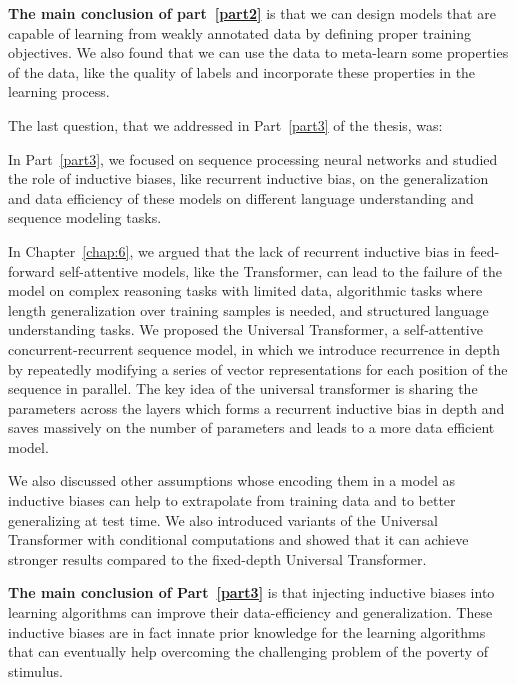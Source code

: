 \textbf{The main conclusion of part~\ref{part2}} is that we can design models that are capable of learning from weakly annotated data by defining proper training objectives. We also found that we can use the data to meta-learn some properties of the data, like the quality of labels and incorporate these properties in the learning process.

\bigskip
The last question, that we addressed in Part~\ref{part3} of the thesis, was:
%

In Part~\ref{part3}, we focused on sequence processing neural networks and studied the role of inductive biases, like recurrent inductive bias, on the generalization and data efficiency of these models on different language understanding and sequence modeling tasks.

In Chapter~\ref{chap:6}, we argued that the lack of recurrent inductive bias in feed-forward self-attentive models, like the Transformer, can lead to the failure of the model on complex reasoning tasks with limited data, algorithmic tasks where length generalization over training samples is needed, and structured language understanding tasks. We proposed the Universal Transformer, a self-attentive concurrent-recurrent sequence model, in which we introduce recurrence in depth by repeatedly modifying a series of vector representations for each position of the sequence in parallel. The key idea of the universal transformer is sharing the parameters across the layers which forms a recurrent inductive bias in depth and saves massively on the number of parameters and leads to a more data efficient model. 

We also discussed other assumptions whose encoding them in a model as inductive biases can help to extrapolate from training data and to better generalizing at test time.  We also introduced variants of the Universal Transformer with conditional computations and showed that it can achieve stronger results compared to the fixed-depth Universal Transformer.

\textbf{The main conclusion of Part~\ref{part3}} is that injecting inductive biases into learning algorithms can improve their data-efficiency and generalization. These inductive biases are in fact innate prior knowledge for the learning algorithms that can eventually help overcoming the challenging problem of the poverty of stimulus.

